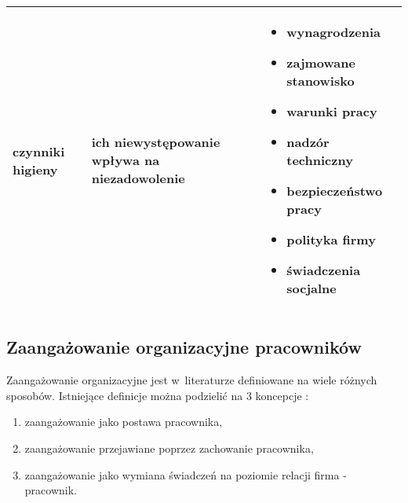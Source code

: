 \begin{minipage}{\textwidth}
\begin{table}[H]
\begin{center}
\begin{tabular}{|P{.2\textwidth}|P{.2\textwidth}|P{.5\textwidth}|}
                         czynniki higieny &
                         ich niewystępowanie wpływa na niezadowolenie &
                         \begin{itemize}
                             \item wynagrodzenia
                             \item zajmowane stanowisko
                             \item warunki pracy
                             \item nadzór techniczny
                             \item bezpieczeństwo pracy
                             \item polityka firmy
                             \item świadczenia socjalne
                             \end{itemize}\\
                         \hline
                     \end{tabular}
                 \end{center}
                 \raggedright{}
                 \vspace{0.75cm}
             \end{table}
\end{minipage}

\subsection{Zaangażowanie organizacyjne pracowników}\label{sec:czynniki-wplywajace-na-fluktuacje:zaangazowanie-organizacyjne}
Zaangażowanie organizacyjne jest w~literaturze definiowane na wiele różnych sposobów.
Istniejące definicje można podzielić na 3 koncepcje \cite{juchnowicz-2010}:
\begin{enumerate}
    \item zaangażowanie jako postawa pracownika,
    \item zaangażowanie przejawiane poprzez zachowanie pracownika,
    \item zaangażowanie jako wymiana świadczeń na poziomie relacji firma - pracownik.
\end{enumerate}

